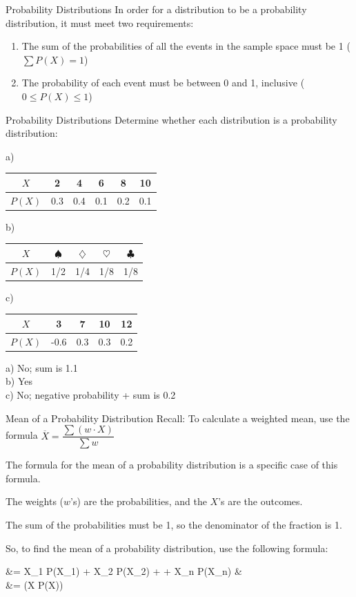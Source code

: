 \documentclass[t, aspectratio=169]{beamer}
\newcommand{\?}{\stackrel{?}{=}}
\begin{document}
	\begin{frame}{Probability Distributions}
		In order for a distribution to be a probability distribution, it must meet two requirements: \pause \begin{enumerate}[1)]
			\item The sum of the probabilities of all the events in the sample space must be 1 ($\sum P(X) = 1$) \pause
			\item The probability of each event must be between 0 and 1, inclusive ($0 \leq P(X) \leq 1$)
		\end{enumerate}
	\end{frame}

	\begin{frame}{Probability Distributions}
		Determine whether each distribution is a probability distribution:
		
		a) \begin{tabular}{c|ccccc}
			$X$ & 2 & 4 & 6 & 8 & 10 \\ \hline
			$P(X)$ & 0.3 & 0.4 & 0.1 & 0.2 & 0.1
		\end{tabular}
	
		b) \begin{tabular}{c|cccc}
			$X$ & $\spadesuit$ & $\diamondsuit$ & $\heartsuit$ & $\clubsuit$ \\ \hline
			$P(X)$ & 1/2 & 1/4 & 1/8 & 1/8
		\end{tabular}
	
		c) \begin{tabular}{c|cccc}
			$X$ & 3 & 7 & 10 & 12 \\ \hline
			$P(X)$ & -0.6 & 0.3 & 0.3 & 0.2	
		\end{tabular} \pause
	
		a) No; sum is 1.1 \pause \\ b) Yes \pause \\ c) No; negative probability + sum is 0.2
	\end{frame}

	\begin{frame}{Mean of a Probability Distribution}
		Recall: To calculate a weighted mean, use the formula $\overline{X} = \dfrac{\sum (w \cdot X)}{\sum w}$
		
		The formula for the mean of a probability distribution is a specific case of this formula. \pause
		
		The weights ($w$'s) are the probabilities, and the $X$'s are the outcomes. \pause
		
		The sum of the probabilities must be 1, so the denominator of the fraction is 1.
		
		So, to find the mean of a probability distribution, use the following formula: \begin{flalign*}
			\mu &= X_1 \cdot P(X_1) + X_2 \cdot P(X_2) + \cdots + X_n \cdot P(X_n) & \\
			&= \sum (X \cdot P(X))
		\end{flalign*} \pause
	\end{frame}
\end{document}
